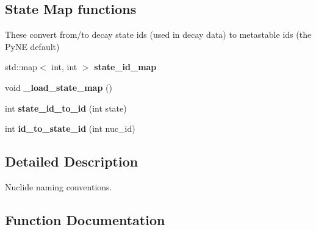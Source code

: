 \subsection*{State Map functions}
\label{_amgrp70bdf518b2e9e67e047a392686df556d}%
These convert from/to decay state ids (used in decay data) to metastable ids (the Py\+NE default) \begin{DoxyCompactItemize}
\item 
std\+::map$<$ int, int $>$ {\bfseries state\+\_\+id\+\_\+map}\hypertarget{namespacepyne_1_1nucname_a1bfcc87b4ac9c3f6634ea5a495871d7b}{}\label{namespacepyne_1_1nucname_a1bfcc87b4ac9c3f6634ea5a495871d7b}

\item 
void {\bfseries \+\_\+load\+\_\+state\+\_\+map} ()\hypertarget{namespacepyne_1_1nucname_aa0f5efb8d3be5214acf8440dae8d4280}{}\label{namespacepyne_1_1nucname_aa0f5efb8d3be5214acf8440dae8d4280}

\item 
int {\bfseries state\+\_\+id\+\_\+to\+\_\+id} (int state)\hypertarget{namespacepyne_1_1nucname_a91e9f43c7bfd01149545704c0a0d003a}{}\label{namespacepyne_1_1nucname_a91e9f43c7bfd01149545704c0a0d003a}

\item 
int {\bfseries id\+\_\+to\+\_\+state\+\_\+id} (int nuc\+\_\+id)\hypertarget{namespacepyne_1_1nucname_aacc2935da529ea5f25324c17a3fba2d4}{}\label{namespacepyne_1_1nucname_aacc2935da529ea5f25324c17a3fba2d4}

\end{DoxyCompactItemize}


\subsection{Detailed Description}
Nuclide naming conventions. 

\subsection{Function Documentation}
